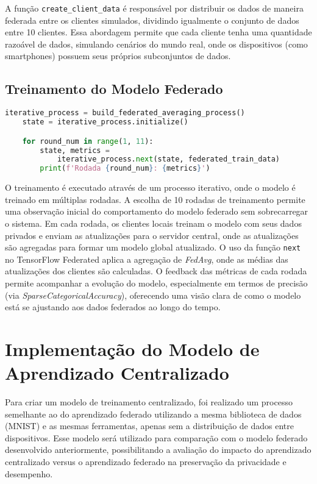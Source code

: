 A função \texttt{create\_client\_data} é responsável por distribuir os dados de maneira federada entre os clientes simulados, dividindo igualmente o conjunto de dados entre 10 clientes. Essa abordagem permite que cada cliente tenha uma quantidade razoável de dados, simulando cenários do mundo real, onde os dispositivos (como smartphones) possuem seus próprios subconjuntos de dados.

\subsection{Treinamento do Modelo Federado}

\begin{lstlisting}[language=Python, caption={Treinamento do modelo federado}, label={lst:federated_training}]
    iterative_process = build_federated_averaging_process()
    state = iterative_process.initialize()

    for round_num in range(1, 11):
        state, metrics = 
            iterative_process.next(state, federated_train_data)
        print(f'Rodada {round_num}: {metrics}')
\end{lstlisting}

O treinamento é executado através de um processo iterativo, onde o modelo é treinado em múltiplas rodadas. A escolha de 10 rodadas de treinamento permite uma observação inicial do comportamento do modelo federado sem sobrecarregar o sistema. Em cada rodada, os clientes locais treinam o modelo com seus dados privados e enviam as atualizações para o servidor central, onde as atualizações são agregadas para formar um modelo global atualizado. O uso da função \texttt{next} no TensorFlow Federated aplica a agregação de \textit{FedAvg}, onde as médias das atualizações dos clientes são calculadas. O feedback das métricas de cada rodada permite acompanhar a evolução do modelo, especialmente em termos de precisão (via \textit{SparseCategoricalAccuracy}), oferecendo uma visão clara de como o modelo está se ajustando aos dados federados ao longo do tempo.

\section{Implementação do Modelo de Aprendizado Centralizado}

Para criar um modelo de treinamento centralizado, foi realizado um processo semelhante ao do aprendizado federado utilizando a mesma biblioteca de dados (MNIST) e as mesmas ferramentas, apenas sem a distribuição de dados entre dispositivos. Esse modelo será utilizado para comparação com o modelo federado desenvolvido anteriormente, possibilitando a avaliação do impacto do aprendizado centralizado versus o aprendizado federado na preservação da privacidade e desempenho.

